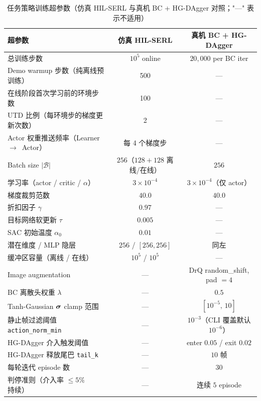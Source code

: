 \begin{table}[htbp]
  \centering
  \caption{任务策略训练超参数（仿真 HIL-SERL 与真机 BC + HG-DAgger 对照；"---" 表示不适用）}
  \label{tab:hyperparams}
  \small
  \begin{tabular}{@{}lcc@{}}
    \toprule
    超参数 & 仿真 HIL-SERL & 真机 BC + HG-DAgger \\
    \midrule
    总训练步数 & $10^5$ online & $20{,}000$ per BC iter \\
    Demo warmup 步数（纯离线预训练） & 500 & --- \\
    在线阶段首次学习前的环境步数 & 100 & --- \\
    UTD 比例（每环境步的梯度更新次数） & 2 & --- \\
    Actor 权重推送频率（Learner~$\to$~Actor） & 每 4 个梯度步 & --- \\
    \midrule
    Batch size $|\mathcal{B}|$ & $256$（$128+128$ 离线/在线） & $256$ \\
    学习率（actor / critic / $\alpha$） & $3 \times 10^{-4}$ & $3 \times 10^{-4}$（仅 actor） \\
    梯度裁剪范数 & $40.0$ & $40.0$ \\
    折扣因子 $\gamma$ & $0.97$ & --- \\
    目标网络软更新 $\tau$ & $0.005$ & --- \\
    SAC 初始温度 $\alpha_0$ & $0.01$ & --- \\
    \midrule
    潜在维度 / MLP 隐层 & $256$ / $[256, 256]$ & 同左 \\
    缓冲区容量（离线 / 在线） & $10^5$ / $10^5$ & --- \\
    Image augmentation & --- & DrQ random\_shift, pad $= 4$ \\
    \midrule
    BC 离散头权重 $\lambda$ & --- & $0.5$ \\
    Tanh-Gaussian $\bm{\sigma}$ clamp 范围 & --- & $[10^{-5},\, 10]$ \\
    静止帧过滤阈值 \texttt{action\_norm\_min} & --- & $10^{-3}$（CLI 覆盖默认 $10^{-6}$） \\
    \midrule
    HG-DAgger 介入触发阈值 & --- & enter $0.05$ / exit $0.02$ \\
    HG-DAgger 释放尾巴 \texttt{tail\_k} & --- & $10$ 帧 \\
    每轮迭代 episode 数 & --- & $30$ \\
    判停准则（介入率 $\leq 5\%$ 持续） & --- & 连续 $5$ episode \\
    \bottomrule
  \end{tabular}
\end{table}

